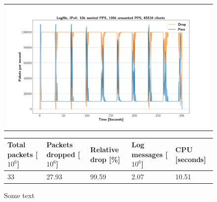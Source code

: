 \begin{figure}[p]
	\label{fig:simplefail2ban:disk:ip4:100k}
	\centering
	\scriptsize
	\begin{tabular}{c}
    	\centerline{\includegraphics[width=1.2\textwidth]{images/simplefail2ban_disk_ipv4_v10k_iv100k_c65534.png}}
	\end{tabular}
	\begin{tabular}{lllll}
		\toprule
		\textbf{Total packets [$10^6$]} & \textbf{Packets dropped [$10^6$]} & \textbf{Relative drop [\%]} & \textbf{Log messages [$10^6$]} & \textbf{CPU [seconds]} \\ \midrule 
		33 & 27.93 & 99.59 & 2.07 & 10.51 \\
		\bottomrule
	\end{tabular}
	\caption[Simplefail2ban, Logfile IPv4, 100k \ac{PPS}]{Some text}
\end{figure}

